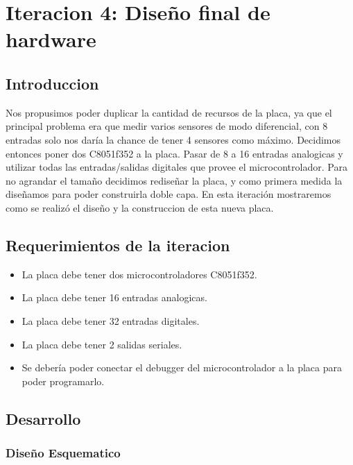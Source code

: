 \chapter{Iteracion 4: Diseño final de hardware} %
\label{cha:iteracion_4}

\section{Introduccion} %
\label{sec:introduccion}

Nos propusimos poder duplicar la cantidad de recursos de la placa, ya que el principal problema era que medir varios sensores de modo diferencial, con 8 entradas solo nos daría la chance de tener 4 sensores como máximo. Decidimos entonces poner dos C8051f352 a la placa. Pasar de 8 a 16 entradas analogicas y utilizar todas las entradas/salidas digitales que provee el microcontrolador. 
Para no agrandar el tamaño decidimos rediseñar la placa, y como primera medida la diseñamos para poder construirla doble capa.
En esta iteración mostraremos como se realizó el diseño y la construccion de esta nueva placa.


\section{Requerimientos de la iteracion} %
\label{sec:requerimientos_de_la_iteracion}

\begin{itemize}
  \item La placa debe tener dos microcontroladores C8051f352.
  \item La placa debe tener 16 entradas analogicas.
  \item La placa debe tener 32 entradas digitales.
  \item La placa debe tener 2 salidas seriales. 
  \item Se debería poder conectar el debugger del microcontrolador a la placa para poder programarlo.
\end{itemize}


\section{Desarrollo} %
\label{sec:desarrollo}

\subsection{Diseño Esquematico}
\label{sub: diseño_esquematico2}

